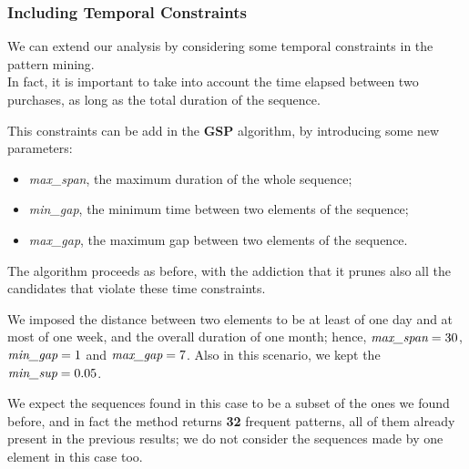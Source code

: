 \subsubsection{Including Temporal Constraints}
We can extend our analysis by considering some temporal constraints in the pattern mining.\\
In fact, it is important to take into account the time elapsed between two purchases, as long as the total duration of the sequence. 

This constraints can be add in the \textbf{GSP} algorithm, by introducing some new parameters:
\begin{itemize}
\item \emph{max\_span}, the maximum duration of the whole sequence;
\item \emph{min\_gap}, the minimum time between two elements of the sequence;
\item \emph{max\_gap}, the maximum gap between two elements of the sequence.
\end{itemize}
The algorithm proceeds as before, with the addiction that it prunes also all the candidates that violate these time constraints.

We imposed the distance between two elements to be at least of one day and at most of one week, and the overall duration of one month; hence, $\emph{max\_span} = 30$, $\emph{min\_gap} = 1$ and $\emph{max\_gap} = 7$. Also in this scenario, we kept the $\emph{min\_sup} = 0.05$.

We expect the sequences found in this case to be a subset of the ones we found before, and in fact the method returns \textbf{32} frequent patterns, all of them already present in the previous results; we do not consider the sequences made by one element in this case too. 
